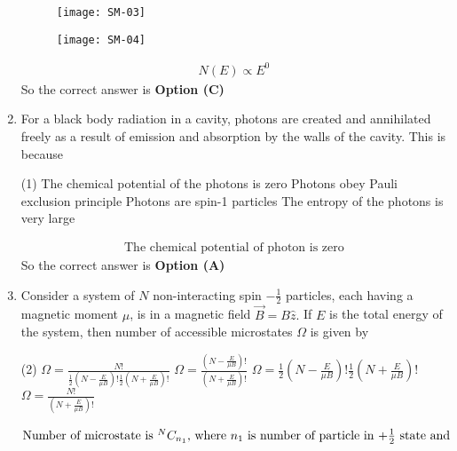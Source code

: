 \begin{enumerate}
\begin{tasks}
\begin{figure}[H]
	\centering
	\texttt{[image: SM-03]}
\end{figure} 
\task[\textbf{D.}] \begin{figure}[H]
	\centering
	\texttt{[image: SM-04]}
\end{figure}
\end{tasks}
\begin{answer}
\begin{align*}
N(E) \propto E^{0}
\end{align*}
So the correct answer is \textbf{Option (C)}
\end{answer}
	\item For a black body radiation in a cavity, photons are created and annihilated freely as a result of emission and absorption by the walls of the cavity. This is because
	{}
\begin{tasks}(1)
\task[\textbf{A.}] The chemical potential of the photons is zero
\task[\textbf{B.}] Photons obey Pauli exclusion principle
\task[\textbf{C.}] Photons are spin-1 particles
\task[\textbf{D.}] The entropy of the photons is very large
\end{tasks}
\begin{answer}
\begin{align*}
\text{The chemical potential of photon is zero}
\end{align*}
So the correct answer is \textbf{Option (A)}
\end{answer}
	\item Consider a system of $N$ non-interacting spin $-\frac{1}{2}$ particles, each having a magnetic moment $\mu$, is in a magnetic field $\vec{B}=B \hat{z} .$ If $E$ is the total energy of the system, then number of accessible microstates $\Omega$ is given by
{	}
\begin{tasks}(2)
\task[\textbf{A.}] $\Omega=\frac{N !}{\frac{1}{2}\left(N-\frac{E}{\mu B}\right) ! \frac{1}{2}\left(N+\frac{E}{\mu B}\right) !}$
\task[\textbf{B.}] $\Omega=\frac{\left(N-\frac{E}{\mu B}\right) !}{\left(N+\frac{E}{\mu B}\right) !}$
\task[\textbf{C.}] $\Omega=\frac{1}{2}\left(N-\frac{E}{\mu B}\right) ! \frac{1}{2}\left(N+\frac{E}{\mu B}\right) !$
\task[\textbf{D.}] $\Omega=\frac{N !}{\left(N+\frac{E}{\mu B}\right) !}$
\end{tasks}
\begin{answer}
\begin{align*}
\intertext{Number of microstate is ${ }^{N} C_{n_{1}}$, where $n_{1}$ is number of particle in $+\frac{1}{2}$ state and}

\end{align*}
\end{answer}
\end{enumerate}
